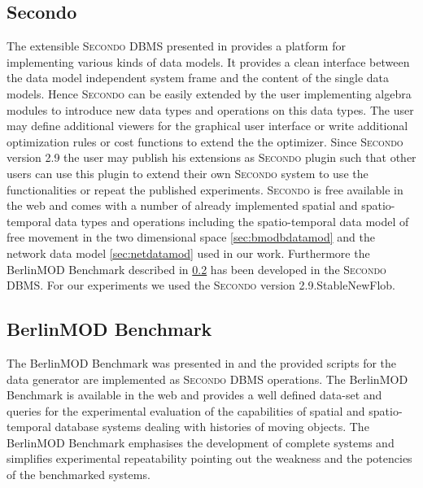 \documentclass[a4paper]{article}
\newcommand{\secondo}{\textsc{Secondo}}
\newcommand{\bmodb} {BerlinMOD Benchmark}
\newcommand{\secver}{2.9.StableNewFlob}
\begin{document}
\subsection{Secondo}
\label{sec:secondo}
The extensible \secondo{} DBMS presented in \cite{686903,1054151} provides a
platform for implementing various kinds of data models. It provides a clean
interface between the data model independent system frame and the content of the
single data models. Hence \secondo{} can be easily extended by the user
implementing algebra modules to introduce  new data types and operations on
this data types. The user may define additional viewers for the graphical user
interface or write additional optimization rules or cost functions to extend the
the optimizer. Since \secondo{} version 2.9 the user may publish his extensions
as \secondo{} plugin such that other users can use this plugin to extend their own
\secondo{} system to use the functionalities or repeat the published experiments.
\secondo{} is free available in the web \cite{secondoweb} and comes with a number
of already implemented spatial and spatio-temporal data types
and operations including the spatio-temporal data model of free movement in the
two dimensional space \ref{sec:bmodbdatamod} and the network data model
\ref{sec:netdatamod} used in our work. Furthermore the \bmodb{} described in
\ref{sec:bmodb} has been developed in the \secondo{} DBMS. For our experiments
we used the \secondo{} version \secver{}.
\subsection{BerlinMOD Benchmark}
\label{sec:bmodb}
The \bmodb{} was presented in \cite{BerlinMODVLDB} \nocite{BerlinMOD} and the
provided scripts for the data generator are implemented as \secondo{} DBMS operations.
The \bmodb{} is available in the web \cite{berlinmodweb} and provides a well defined
data-set and queries for the experimental evaluation of the capabilities of
spatial and spatio-temporal database systems dealing with histories of moving
objects. The \bmodb{} emphasises the development of complete systems
and simplifies experimental repeatability pointing out the weakness and the potencies
of the benchmarked systems.
\end{document}
